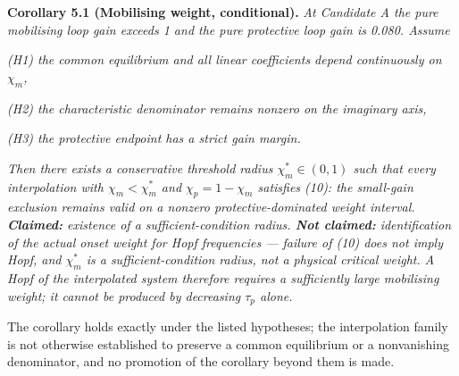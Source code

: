 \documentclass[11pt]{article}
\begin{document}
\textbf{Corollary 5.1 (Mobilising weight, conditional).} \emph{At
Candidate A the pure mobilising loop gain exceeds 1 and the pure
protective loop gain is 0.080. Assume}

\emph{(H1) the common equilibrium and all linear coefficients depend
continuously on \(\chi_m\),}

\emph{(H2) the characteristic denominator remains nonzero on the
imaginary axis,}

\emph{(H3) the protective endpoint has a strict gain margin.}

\emph{Then there exists a conservative threshold radius
\(\chi_m^* \in (0,1)\) such that every interpolation with
\(\chi_m < \chi_m^*\) and \(\chi_p = 1 - \chi_m\) satisfies (10): the
small-gain exclusion remains valid on a nonzero protective-dominated
weight interval. \textbf{Claimed:} existence of a sufficient-condition
radius. \textbf{Not claimed:} identification of the actual onset weight
for Hopf frequencies --- failure of (10) does not imply Hopf, and
\(\chi_m^*\) is a sufficient-condition radius, not a physical critical
weight. A Hopf of the interpolated system therefore requires a
sufficiently large mobilising weight; it cannot be produced by
decreasing \(\tau_p\) alone.}

The corollary holds exactly under the listed hypotheses; the
interpolation family is not otherwise established to preserve a common
equilibrium or a nonvanishing denominator, and no promotion of the
corollary beyond them is made.
\end{document}
